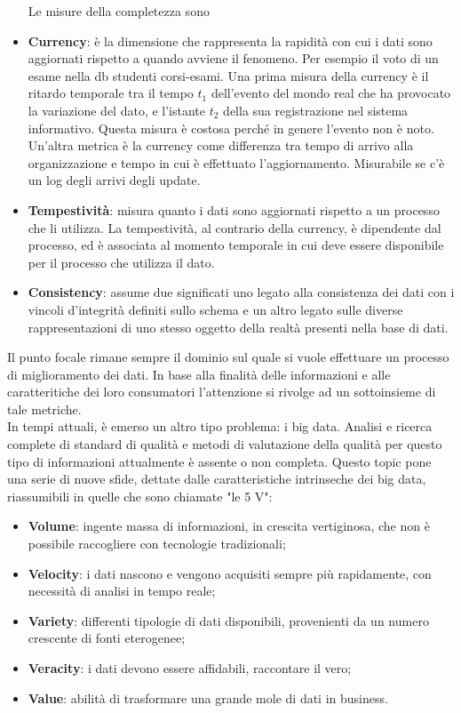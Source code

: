 \documentclass[a4paper,12pt]{article}
\begin{document}
\begin{itemize}
Le misure della completezza sono
\item \textbf{Currency}: è la dimensione che rappresenta la rapidità con cui i dati sono aggiornati rispetto a quando avviene il fenomeno. Per esempio il voto di un esame nella db studenti corsi-esami. Una prima misura della currency è il ritardo temporale tra il tempo $t_1$ dell'evento del mondo real che ha provocato la variazione del dato, e l'istante $t_2$ della sua registrazione nel sistema informativo. Questa misura è costosa perché in genere l'evento non è noto. Un'altra metrica è la currency come differenza tra tempo di arrivo alla organizzazione e tempo in cui è effettuato l'aggiornamento. Misurabile se c'è un log degli arrivi degli update.

\item \textbf{Tempestività}: misura quanto i dati sono aggiornati rispetto a un processo che li utilizza. La tempestività, al contrario della currency, è dipendente dal processo, ed è associata al momento temporale in cui deve essere disponibile per il processo che utilizza il dato.
\item \textbf{Consistency}: assume due significati uno legato alla consistenza dei dati con i vincoli d'integrità definiti sullo schema e un altro legato sulle diverse rappresentazioni di uno stesso oggetto della realtà presenti nella base di dati.
\end{itemize} 

\bigskip

\noindent Il punto focale rimane sempre il dominio sul quale si vuole effettuare un processo di miglioramento dei dati. In base alla finalità delle informazioni e alle caratteritiche dei loro consumatori l'attenzione si rivolge ad un sottoinsieme di tale metriche.\\

\noindent In tempi attuali, è emerso un altro tipo problema: i big data. Analisi e ricerca complete di standard di qualità e metodi di valutazione della qualità per questo tipo di informazioni attualmente è assente o non completa. Questo topic pone una serie di nuove sfide, dettate dalle caratteristiche intrinseche dei big data, riassumibili in quelle che sono chiamate "le 5 V":
\begin{itemize}
	\item \textbf{Volume}: ingente massa di informazioni, in crescita vertiginosa, che non è possibile raccogliere con tecnologie tradizionali;
	\item \textbf{Velocity}: i dati nascono e vengono acquisiti sempre più rapidamente, con necessità di analisi in tempo reale;
	\item \textbf{Variety}: differenti tipologie di dati disponibili, provenienti da un numero crescente di fonti eterogenee;
	\item \textbf{Veracity}: i dati devono essere affidabili, raccontare il vero;
	\item \textbf{Value}: abilità di trasformare una grande mole di dati in business.
\end{itemize}
\end{document}
